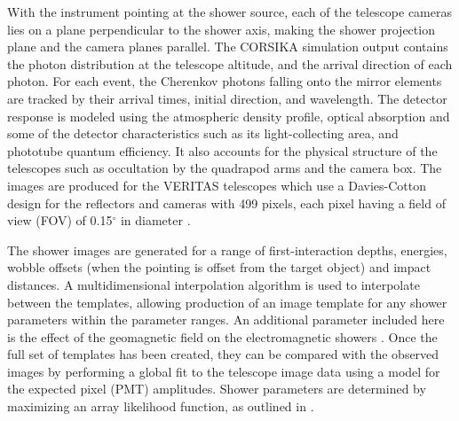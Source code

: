 \documentclass[main.tex]{subfiles}
\begin{document}
With the instrument pointing at the shower source, each of the telescope cameras lies on a plane perpendicular to the shower axis, making the shower projection plane and the camera planes parallel. The CORSIKA simulation output contains the photon distribution at the telescope altitude, and the arrival direction of each photon. For each event, the Cherenkov photons falling onto the mirror elements are tracked by their arrival times, initial direction, and wavelength. The detector response is modeled using the atmospheric density profile, optical absorption and some of the detector characteristics such as its light-collecting area, and phototube quantum efficiency. It also accounts for the physical structure of the telescopes such as occultation by the quadrapod arms and the camera box. The images are produced for the VERITAS telescopes which use a Davies-Cotton design for the reflectors and cameras with 499 pixels, each pixel having a field of view (FOV) of 0.15$^\circ$ in diameter \cite{veritas_specs}.

The shower images are generated for a range of first-interaction depths, energies, wobble offsets (when the pointing is offset from the target object) and impact distances. A multidimensional interpolation algorithm is used to interpolate between the templates, allowing production of an image template for any shower parameters within the parameter ranges. An additional parameter included here is the effect of the geomagnetic field on the electromagnetic showers \cite{Vincent:2015bnj}.
Once the full set of templates has been created, they can be compared with the observed images by performing a global fit to the telescope image data using a model for the expected pixel (PMT) amplitudes. Shower parameters are determined by maximizing an array likelihood function, as outlined in \cite{deNaurois}.
\end{document}
